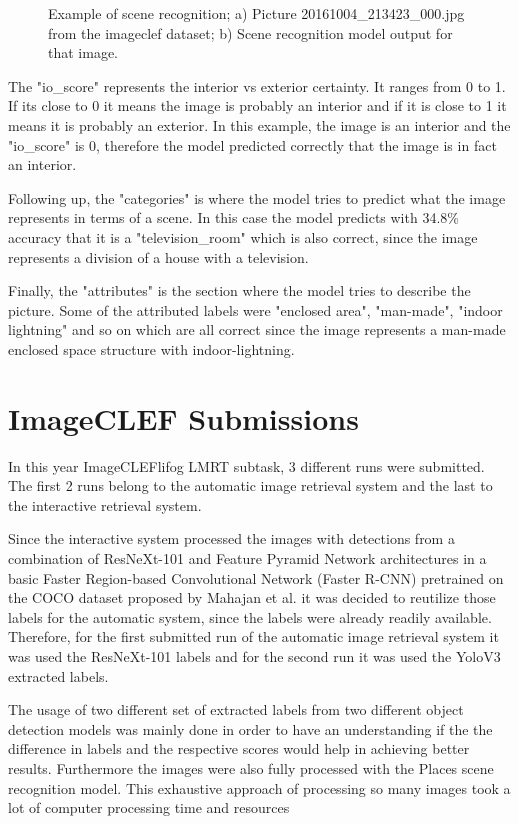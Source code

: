 \begin{figure}[H]
    \caption[Example of scene recognition]{Example of scene recognition; a) Picture 20161004\_213423\_000.jpg from the imageclef dataset; b) Scene recognition model output for that image.}

    \label{fig:imagea}
    \end{figure}


    The "io\_score" represents the interior vs exterior certainty. It ranges from 0 to 1. If its close to 0 it means the image is probably an interior and if it is close to 1 it means it is probably an exterior. In this example, the image is an interior and the "io\_score" is 0, therefore the model predicted correctly that the image is in fact an interior.

    Following up, the "categories" is where the model tries to predict what the image represents in terms of a scene. In this case the model predicts with 34.8\% accuracy that it is a "television\_room" which is also correct, since the image represents a division of a house with a television.

    Finally, the "attributes" is the section where the model tries to describe the picture. Some of the attributed labels were "enclosed area", "man-made", "indoor lightning" and so on which are all correct since the image represents a man-made enclosed space structure with indoor-lightning.

\section{ImageCLEF Submissions}
\label{sec:runs}


    In this year ImageCLEFlifog LMRT subtask, 3 different runs were submitted. The first 2 runs belong to the automatic image retrieval system and the last to the interactive retrieval system. 
    
    Since the interactive system processed the images with detections from a combination of ResNeXt-101 and Feature Pyramid Network architectures in a basic Faster Region-based Convolutional Network (Faster R-CNN) pretrained on the COCO dataset proposed by Mahajan et al. \cite{Mahajan2018} it was decided to reutilize those labels for the automatic system, since the labels were already readily available.  Therefore, for the first submitted run of the automatic image retrieval system it was used the ResNeXt-101 labels and for the second run it was used the YoloV3 \cite{Redmon2018} extracted labels.
    
    The usage of two different set of extracted labels from two different object detection models was mainly done in order to have an understanding if the the difference in labels and the respective scores would help in achieving better results. Furthermore the images were also fully processed with the Places scene recognition model. This exhaustive approach of processing so many images took a lot of computer processing time and resources


